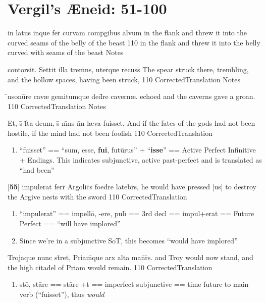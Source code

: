 \section{Vergil's {\AE}neid: 51-100} %

\latline
  {in latus inque fer\={\macron {\i}} curvam comp\={}gibus alvum}
  { in the flank and threw it into the curved seams of the belly of the beast }
  {110}
  { in the flank and threw it into the belly curved with seams of the beast }
  { Notes }


\latline
  {contorsit.  Settit illa trem\={}ns, uter\={}que recuss\={}}
  { The spear struck there, trembling, and the hollow spaces, having been struck, }
  {110}
  { CorrectedTranslation }
  { Notes }


\latline
  {\={\macron {\i}}nsonu\={}re cav{\ae} gemitumque ded\={}re cavern{\ae}.}
  { echoed and the caverns gave a groan. }
  {110}
  { CorrectedTranslation }
  { Notes }


\latline
  {Et, s\={\macron {\i}} f\={}ta deum, s\={\macron {\i}} m\={}ns n\={}n l{\ae}va fuisset,}
  { And if the fates of the gods had not been hostile, if the mind had not been foolish  }
  {110}
  { CorrectedTranslation }
  { \begin{enumerate}
  	\item ``fuisset'' == ``sum, esse, \textbf{fui}, fut\={u}rus'' + ``\textbf{isse}'' == Active Perfect Infinitive + Endings.  This indicates subjunctive, active past-perfect and is translated as ``had been''
  \end{enumerate} }


\latline
  {[\textbf{55}] impulerat ferr\={} Argolic\={}s foed\={}re latebr\={}s,}
  { he would have pressed [us] to destroy the Argive nests with the sword }
  {110}
  { CorrectedTranslation }
  { \begin{enumerate}
  	\item ``impulerat'' == impell\={o}, -ere, pul\={\i} == 3rd decl == impul+erat == Future Perfect == ``will have implored''
  	\item Since we're in a subjunctive SoT, this becomes ``would have implored''
  \end{enumerate} }


\latline
  {Trojaque nunc st\={}ret, Priam\={\macron {\i}}que arx alta man\={}r\={}s.}
  { and Troy would now stand, and the high citadel of Priam would remain. }
  {110}
  { CorrectedTranslation }
  { \begin{enumerate}
  	\item st\={o}, st\={a}re == st\={a}re +t == imperfect subjunctive == time future to main verb (``fuisset''), thus \emph{would}
  \end{enumerate} }


